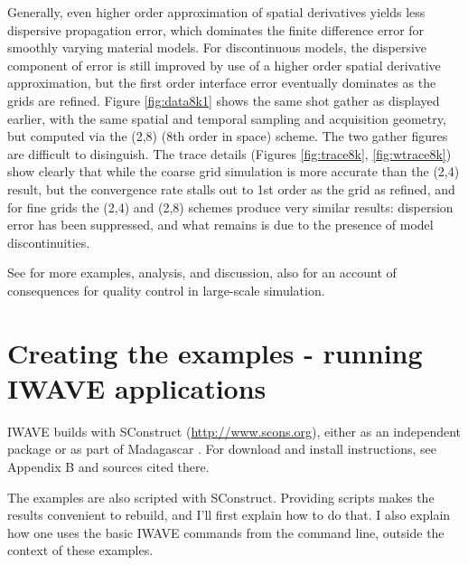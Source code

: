 Generally, even higher order approximation of spatial derivatives
yields less dispersive propagation error, which dominates the finite
difference error for smoothly varying material models. For
discontinuous models, the dispersive component of error is still
improved by use of a higher order spatial derivative approximation,
but the first order interface error eventually dominates as the grids
are refined. Figure \ref{fig:data8k1} shows the same shot gather as
displayed earlier, with the same spatial and temporal sampling and
acquisition geometry, but computed via the (2,8) (8th order in space)
scheme. The two gather figures are difficult to disinguish. The trace
details (Figures \ref{fig:trace8k}, \ref{fig:wtrace8k}) show clearly
that while the coarse grid simulation is more accurate than the (2,4)
result, but the convergence rate stalls out to 1st order as the grid
as refined, and for fine grids the (2,4) and (2,8) schemes produce
very similar results: dispersion error has been suppressed, and what
remains is due to the presence of model discontinuities.

See
\cite[]{SymesVdovina:09} for more examples, analysis, and discussion,
also \cite[]{FehlerKeliher:2011} for an account of consequences for quality control in
large-scale simulation.

\section{Creating the examples - running IWAVE applications}
IWAVE builds with SConstruct (\url{http://www.scons.org}), either as an
independent package or as part of Madagascar \cite[]{Madagascar}. For
download and install instructions, see Appendix B and sources cited
there.

The examples are also scripted with SConstruct. Providing scripts
makes the results convenient to rebuild, and I'll first explain how to do
that. I also explain how one uses the basic IWAVE commands from
the command line, outside the context of these examples.

